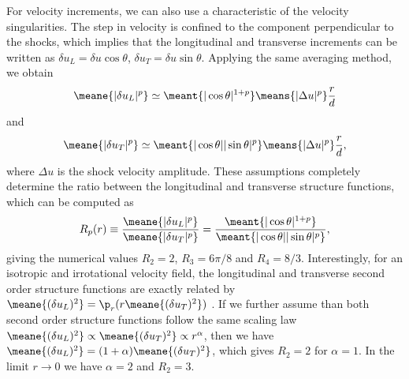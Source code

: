 For velocity increments, we can also use a characteristic of the
velocity singularities.  The step in velocity is confined to  the component
perpendicular to the shocks, which implies that the longitudinal and
transverse increments can be written as  $\delta u_L = \delta u
\cos\theta$, $\delta u_T = \delta u \sin\theta$.
%
Applying the same averaging method, we obtain
\begin{equation} \label{StepL}
\meane{|\delta u_L|^p} 
\simeq 
\meant{|\cos\theta|^{1+p}}
\means{|\Delta u |^p} \frac{r}{d}
\end{equation}
and
\begin{equation} \label{StepT} 
\meane{|\delta u_T|^p} 
\simeq 
\meant{|\cos\theta||\sin\theta|^{p}}
\means{|\Delta u |^p} \frac{r}{d},
\end{equation}
where $\Delta u $ is the shock velocity amplitude.
%
These assumptions completely determine the ratio between the
longitudinal and transverse structure functions, which can be computed as
\begin{eqnarray} \label{Ratio}
R_p(r) \equiv \frac{\meane{|\delta u_L|^p}}{\meane{|\delta u_T|^p}} = 
\frac{\meant{|\cos\theta|^{1+p}}}{\meant{|\cos\theta||\sin\theta|^p}},
\end{eqnarray}
giving the numerical values $R_2 = 2$, $R_3 = 6\pi/8$ and $R_4 = 8/3$.
Interestingly, for an isotropic and irrotational velocity field, the longitudinal and transverse second order structure functions
are exactly related by $\meane{(\delta u_L)^2} = \p_r( r\meane{(\delta
u_T)^2} )$ \cite[]{Lindborg2007jas}. If we further assume than both second order structure functions follow
the same scaling law $\meane{ (\delta u_L)^2} \propto \meane{ (\delta
u_T)^2} \propto r^\alpha$, then we have $\meane{ (\delta u_L)^2} =
(1+\alpha) \meane{ (\delta u_T)^2} $, which gives $ R_2 = 2 $ for 
$  \alpha = 1$.  In the limit $ r \rightarrow 0 $ we have $ \alpha = 2 $ and $ R_2 = 3 $.
%

